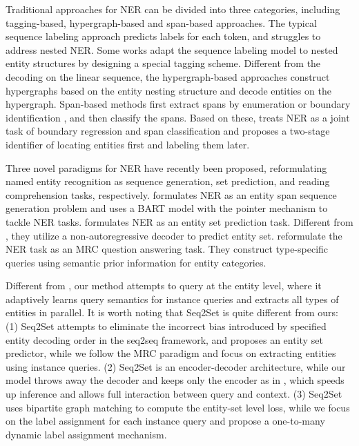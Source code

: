 \documentclass[11pt]{article}
\begin{document}
Traditional approaches for NER can be divided into three categories, including tagging-based, hypergraph-based and span-based approaches. The typical sequence labeling approach \citep{huang2015bidirectional} predicts labels for each token, and struggles to address nested NER. Some works \citep{alex-etal-2007-recognising, wang-etal-2020-pyramid} adapt the sequence labeling model to nested entity structures by designing a special tagging scheme. Different from the decoding on the linear sequence, the hypergraph-based approaches \citep{lu-roth-2015-joint, muis-lu-2017-labeling, katiyar-cardie-2018-nested} construct hypergraphs based on the entity nesting structure and decode entities on the hypergraph. Span-based methods first extract spans by enumeration \citep{sohrab-miwa-2018-deep, luan-etal-2019-general} or boundary identification \citep{zheng-etal-2019-boundary, Tan_Qiu_Chen_Wang_Huang_2020}, and then classify the spans. Based on these, \citet{shen2021locateandlabel} treats NER as a joint task of boundary regression and span classification and proposes a two-stage identifier of locating entities first and labeling them later.

Three novel paradigms for NER have recently been proposed, reformulating named entity recognition as sequence generation, set prediction, and reading comprehension tasks, respectively. \citet{yan2021bartner} formulates NER as an entity span sequence generation problem and uses a BART \citep{lewis-etal-2020-bart} model with the pointer mechanism to tackle  NER tasks. \citet{tan2021sequencetoset} formulates NER as an entity set prediction task. Different from \citet{strakova-etal-2019-neural}, they  utilize a non-autoregressive decoder to predict entity set. \citet{li-etal-2020-unified, mengge-etal-2020-coarse} reformulate the NER task as an MRC question answering task. They construct type-specific queries using semantic prior information for entity categories.

Different from \citet{li-etal-2020-unified, jiang2021new}, our method attempts to query at the entity level, where it adaptively learns query semantics for instance queries and extracts all types of entities in parallel. 
It is worth noting that Seq2Set \citep{tan2021sequencetoset} is quite different from ours: (1) Seq2Set attempts to eliminate the incorrect bias introduced by specified entity decoding order in the seq2seq framework, and proposes an entity set predictor, while we follow the MRC paradigm and focus on extracting entities using instance queries. (2) Seq2Set is an encoder-decoder architecture, while our model throws away the decoder and keeps only the encoder as in \citet{wenwang}, which speeds up inference and allows full interaction between query and context.
(3) Seq2Set uses bipartite graph matching to compute the entity-set level loss, while we focus on the label assignment for each instance query and propose a one-to-many dynamic label assignment mechanism.
\end{document}
